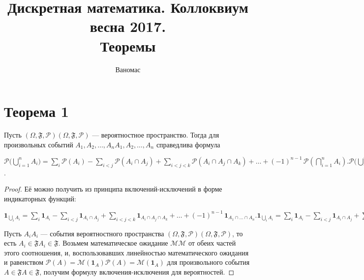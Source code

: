 \documentclass[a4paper,12pt]{article}
\begin{document}
	\title{Дискретная математика. Коллоквиум весна 2017. \\ Теоремы}
	\author{Ваномас}
	\maketitle
	\tableofcontents
    \pagebreak
    \section {Теорема 1}
    \begin{theorem}
   Пусть ${\displaystyle (\Omega ,{\mathfrak {F}},{\mathcal {P}})} (\Omega ,{\mathfrak {F}},{\mathcal {P}})$ — вероятностное пространство. Тогда для произвольных событий ${\displaystyle A_{1},A_{2},\ldots ,A_{n}} A_{1},A_{2},\ldots ,A_{n}$ справедлива формула

${\displaystyle {\mathcal {P}}{\biggl (}\bigcup _{i=1}^{n}A_{i}{\biggr )}=\sum _{i}{\mathcal {P}}(A_{i})-\sum _{i<j}{\mathcal {P}}(A_{i}\cap A_{j})+\sum _{i<j<k}{\mathcal {P}}(A_{i}\cap A_{j}\cap A_{k})+\ldots +(-1)^{n-1}\,{\mathcal {P}}\left(\bigcap _{i=1}^{n}A_{i}\right).} {\mathcal {P}}{\biggl (}\bigcup _{i=1}^{n}A_{i}{\biggr )}=\sum _{i}{\mathcal {P}}(A_{i})-\sum _{i<j}{\mathcal {P}}(A_{i}\cap A_{j})+\sum _{i<j<k}{\mathcal {P}}(A_{i}\cap A_{j}\cap A_{k})+\ldots +(-1)^{n-1}\,{\mathcal {P}}\left(\bigcap _{i=1}^{n}A_{i}\right)$.
    \end{theorem}
    \begin{proof}
    Её можно получить из принципа включений-исключений в форме индикаторных функций:

${\displaystyle \mathbf {1} _{\bigcup _{i}A_{i}}=\sum _{i}\mathbf {1} _{A_{i}}-\sum _{i<j}\mathbf {1} _{A_{i}\cap A_{j}}+\sum _{i<j<k}\mathbf {1} _{A_{i}\cap A_{j}\cap A_{k}}+\ldots +(-1)^{n-1}\,\mathbf {1} _{A_{1}\cap \ldots \cap A_{n}}.} \mathbf {1} _{\bigcup _{i}A_{i}}=\sum _{i}\mathbf {1} _{A_{i}}-\sum _{i<j}\mathbf {1} _{A_{i}\cap A_{j}}+\sum _{i<j<k}\mathbf {1} _{A_{i}\cap A_{j}\cap A_{k}}+\ldots +(-1)^{n-1}\,\mathbf {1} _{A_{1}\cap \ldots \cap A_{n}}.$

Пусть ${\displaystyle A_{i}} A_{i}$ — события вероятностного пространства ${\displaystyle (\Omega ,{\mathfrak {F}},{\mathcal {P}})} (\Omega ,{\mathfrak {F}},{\mathcal {P}})$, то есть ${\displaystyle A_{i}\in {\mathfrak {F}}} A_{i}\in {\mathfrak {F}}$. Возьмем математическое ожидание ${\displaystyle {\mathcal {M}}} {\mathcal {M}}$ от обеих частей этого соотношения, и, воспользовавших линейностью математического ожидания и равенством ${\displaystyle {\mathcal {P}}(A)={\mathcal {M}}(\mathbf {1} _{A})} {\mathcal {P}}(A)={\mathcal {M}}(\mathbf {1} _{A})$ для произвольного события ${\displaystyle A\in {\mathfrak {F}}} {\displaystyle A\in {\mathfrak {F}}}$, получим формулу включения-исключения для вероятностей.
    
    \end{proof}
    
\end{document}
